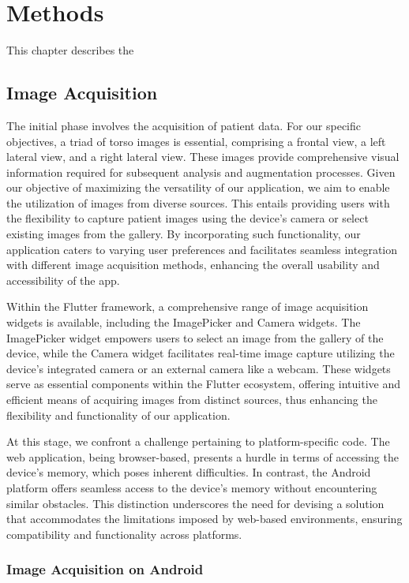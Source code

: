 \chapter{Methods}

This chapter describes the 

\section{Image Acquisition}

The initial phase involves the acquisition of patient data. For our specific objectives, a triad of torso images is essential, comprising a frontal view, a left lateral view, and a right lateral view. These images provide comprehensive visual information required for subsequent analysis and augmentation processes.
Given our objective of maximizing the versatility of our application, we aim to enable the utilization of images from diverse sources. 
This entails providing users with the flexibility to capture patient images using the device's camera or select existing images from the gallery. 
By incorporating such functionality, our application caters to varying user preferences and facilitates seamless integration with different image acquisition methods, enhancing the overall usability and accessibility of the app.

Within the Flutter framework, a comprehensive range of image acquisition widgets is available, including the ImagePicker and Camera widgets. 
The ImagePicker widget empowers users to select an image from the gallery of the device, while the Camera widget facilitates real-time image capture utilizing the device's integrated camera or an external camera like a webcam. 
These widgets serve as essential components within the Flutter ecosystem, offering intuitive and efficient means of acquiring images from distinct sources, thus enhancing the flexibility and functionality of our application.

At this stage, we confront a challenge pertaining to platform-specific code. The web application, being browser-based, presents a hurdle in terms of accessing the device's memory, which poses inherent difficulties. In contrast, the Android platform offers seamless access to the device's memory without encountering similar obstacles. 
This distinction underscores the need for devising a solution that accommodates the limitations imposed by web-based environments, ensuring compatibility and functionality across platforms.

\subsection{Image Acquisition on Android}

